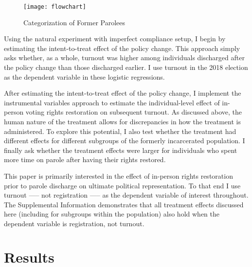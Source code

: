 \documentclass[
  12pt,
]{article}
\begin{document}
\begin{figure}[H]

{\centering \texttt{[image: flowchart]} 

}

\caption{\label{fig:flow}Categorization of Former Parolees}\label{fig:flow}
\end{figure}

Using the natural experiment with imperfect compliance setup, I begin by estimating the intent-to-treat effect of the policy change. This approach simply asks whether, as a whole, turnout was higher among individuals discharged after the policy change than those discharged earlier. I use turnout in the 2018 election as the dependent variable in these logistic regressions.

After estimating the intent-to-treat effect of the policy change, I implement the instrumental variables approach to estimate the individual-level effect of in-person voting rights restoration on subsequent turnout. As discussed above, the human nature of the treatment allows for discrepancies in how the treatment is administered. To explore this potential, I also test whether the treatment had different effects for different subgroups of the formerly incarcerated population. I finally ask whether the treatment effects were larger for individuals who spent more time on parole after having their rights restored.

This paper is primarily interested in the effect of in-person rights restoration prior to parole discharge on ultimate political representation. To that end I use turnout ----- not registration ----- as the dependent variable of interest throughout. The Supplemental Information demonstrates that all treatment effects discussed here (including for subgroups within the population) also hold when the dependent variable is registration, not turnout.

\hypertarget{results}{%
\section*{Results}\label{results}}
\end{document}

